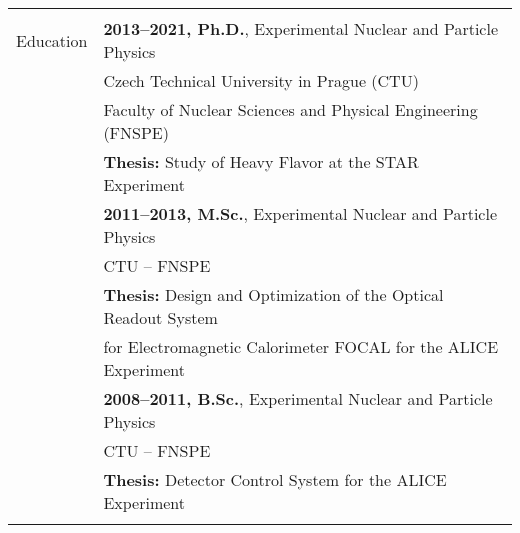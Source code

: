 \documentclass[a4paper,11pt,oneside]{article}
\begin{document}
\noindent \begin{tabular}{@{} l l}
\hline \\
 \Large{Education}   
     & \textbf{2013--2021, Ph.D.}, Experimental Nuclear and Particle Physics \\
     & {Czech Technical University in Prague (CTU)} \\
     & {Faculty of Nuclear Sciences and Physical Engineering (FNSPE)} \\
     & \textbf{Thesis:} Study of Heavy Flavor at the STAR Experiment \\[.3cm]
     & \textbf{2011--2013, M.Sc.}, Experimental Nuclear and Particle Physics \\
     & CTU -- FNSPE \\
     & \textbf{Thesis:} Design and Optimization of the Optical Readout System \\
     & for Electromagnetic Calorimeter FOCAL for the ALICE Experiment \\[.3cm]
     & \textbf{2008--2011, B.Sc.}, Experimental Nuclear and Particle Physics \\
     & CTU -- FNSPE \\
     & \textbf{Thesis:} Detector Control System for the ALICE Experiment \\
     \\
   

\end{tabular}
\end{document}

